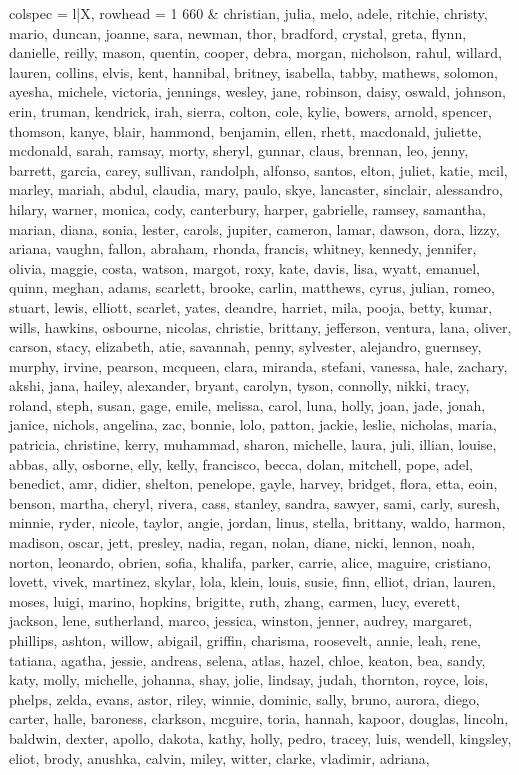 \begin{tblr}[
  long,
  caption = {Examples from SNLI.},
  entry = {Short Caption},
  label = {tblr:test},
]{
colspec = {l|X},
rowhead = 1}
660 & christian, julia, melo, adele, ritchie, christy, mario, duncan, joanne, sara, newman, thor, bradford, crystal, greta, flynn, danielle, reilly, mason, quentin, cooper, debra, morgan, nicholson, rahul, willard, lauren, collins, elvis, kent, hannibal, britney, isabella, tabby, mathews, solomon, ayesha, michele, victoria, jennings, wesley, jane, robinson, daisy, oswald, johnson, erin, truman, kendrick, irah, sierra, colton, cole, kylie, bowers, arnold, spencer, thomson, kanye, blair, hammond, benjamin, ellen, rhett, macdonald, juliette, mcdonald, sarah, ramsay, morty, sheryl, gunnar, claus, brennan, leo, jenny, barrett, garcia, carey, sullivan, randolph, alfonso, santos, elton, juliet, katie, mcil, marley, mariah, abdul, claudia, mary, paulo, skye, lancaster, sinclair, alessandro, hilary, warner, monica, cody, canterbury, harper, gabrielle, ramsey, samantha, marian, diana, sonia, lester, carols, jupiter, cameron, lamar, dawson, dora, lizzy, ariana, vaughn, fallon, abraham, rhonda, francis, whitney, kennedy, jennifer, olivia, maggie, costa, watson, margot, roxy, kate, davis, lisa, wyatt, emanuel, quinn, meghan, adams, scarlett, brooke, carlin, matthews, cyrus, julian, romeo, stuart, lewis, elliott, scarlet, yates, deandre, harriet, mila, pooja, betty, kumar, wills, hawkins, osbourne, nicolas, christie, brittany, jefferson, ventura, lana, oliver, carson, stacy, elizabeth, atie, savannah, penny, sylvester, alejandro, guernsey, murphy, irvine, pearson, mcqueen, clara, miranda, stefani, vanessa, hale, zachary, akshi, jana, hailey, alexander, bryant, carolyn, tyson, connolly, nikki, tracy, roland, steph, susan, gage, emile, melissa, carol, luna, holly, joan, jade, jonah, janice, nichols, angelina, zac, bonnie, lolo, patton, jackie, leslie, nicholas, maria, patricia, christine, kerry, muhammad, sharon, michelle, laura, juli, illian, louise, abbas, ally, osborne, elly, kelly, francisco, becca, dolan, mitchell, pope, adel, benedict, amr, didier, shelton, penelope, gayle, harvey, bridget, flora, etta, eoin, benson, martha, cheryl, rivera, cass, stanley, sandra, sawyer, sami, carly, suresh, minnie, ryder, nicole, taylor, angie, jordan, linus, stella, brittany, waldo, harmon, madison, oscar, jett, presley, nadia, regan, nolan, diane, nicki, lennon, noah, norton, leonardo, obrien, sofia, khalifa, parker, carrie, alice, maguire, cristiano, lovett, vivek, martinez, skylar, lola, klein, louis, susie, finn, elliot, drian, lauren, moses, luigi, marino, hopkins, brigitte, ruth, zhang, carmen, lucy, everett, jackson, lene, sutherland, marco, jessica, winston, jenner, audrey, margaret, phillips, ashton, willow, abigail, griffin, charisma, roosevelt, annie, leah, rene, tatiana, agatha, jessie, andreas, selena, atlas, hazel, chloe, keaton, bea, sandy, katy, molly, michelle, johanna, shay, jolie, lindsay, judah, thornton, royce, lois, phelps, zelda, evans, astor, riley, winnie, dominic, sally, bruno, aurora, diego, carter, halle, baroness, clarkson, mcguire, toria, hannah, kapoor, douglas, lincoln, baldwin, dexter, apollo, dakota, kathy, holly, pedro, tracey, luis, wendell, kingsley, eliot, brody, anushka, calvin, miley, witter, clarke, vladimir, adriana, 
\end{tblr}
